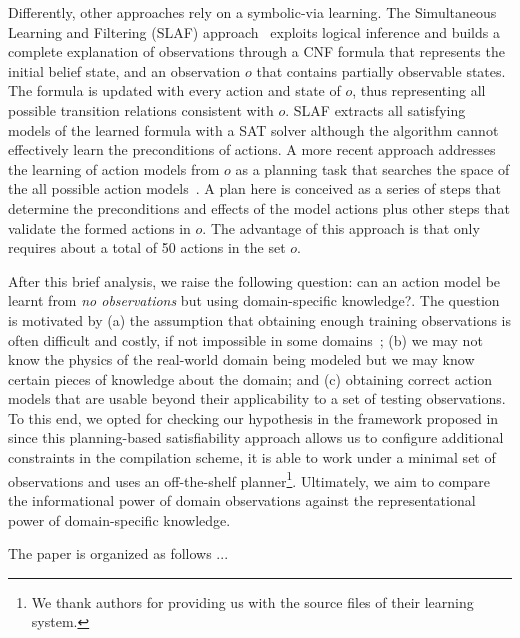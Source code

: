 \documentclass{article}
\newcommand{\SLAF}{{\small {\sffamily SLAF}}\xspace}
\begin{document}
Differently, other approaches rely on a symbolic-via learning. The Simultaneous Learning and Filtering (\SLAF) approach~\cite{AmirC08} exploits logical inference and builds a complete explanation of observations through a CNF formula that represents the initial belief state, and an observation $o$ that contains partially observable states. The formula is updated with every action and state of $o$, thus representing all possible transition relations consistent with $o$. \SLAF extracts all satisfying models of the learned formula with a SAT solver although the algorithm cannot effectively learn the preconditions of actions. A more recent approach addresses the learning of action models from $o$ as a planning task that searches the space of the all possible action models~\cite{aineto2018learning}. A plan here is conceived as a series of steps that determine the preconditions and effects of the model actions plus other steps that validate the formed actions in $o$. The advantage of this approach is that only requires about a total of 50 actions in the set $o$.

After this brief analysis, we raise the following question: can an action model be learnt from \emph{no observations} but using domain-specific knowledge?. The question is motivated by (a) the assumption that obtaining enough training observations is often difficult and costly, if not impossible in some domains~\cite{Zhuo15}; (b) we may not know the physics of the real-world domain being modeled but we may know certain pieces of knowledge about the domain; and (c) obtaining correct action models that are usable beyond their applicability to a set of testing observations. To this end, we opted for checking our hypothesis in the framework proposed in ~\cite{aineto2018learning} since this planning-based satisfiability approach allows us to configure additional constraints in the compilation scheme, it is able to work under a minimal set of observations and uses an off-the-shelf planner\footnote{We thank authors for providing us with the source files of their learning system.}. Ultimately, we aim to compare the informational power of domain observations against the representational power of domain-specific knowledge.

The paper is organized as follows ... 



\end{document}
